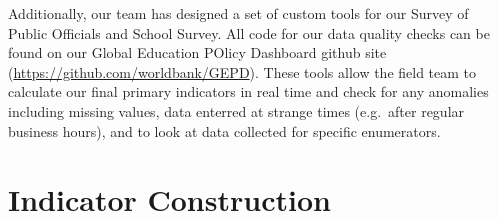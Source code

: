 \documentclass[]{article}
\begin{document}
Additionally, our team has designed a set of custom tools for our Survey
of Public Officials and School Survey. All code for our data quality
checks can be found on our Global Education POlicy Dashboard github site
(\url{https://github.com/worldbank/GEPD}). These tools allow the field
team to calculate our final primary indicators in real time and check
for any anomalies including missing values, data enterred at strange
times (e.g.~after regular business hours), and to look at data collected
for specific enumerators.

\hypertarget{indicator-construction}{%
\section{Indicator Construction}\label{indicator-construction}}
\end{document}
